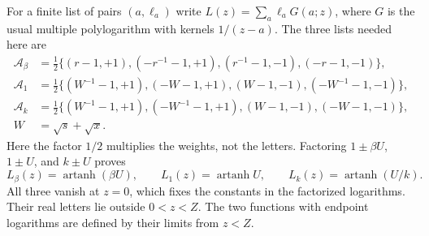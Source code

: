 For a finite list of pairs $(a,\ell_a)$ write
$L(z)=\sum_a\ell_aG(a;z)$, where $G$ is the usual multiple
polylogarithm with kernels $1/(z-a)$. The three lists needed here are
\begin{align}
 \mathcal A_\beta&=\tfrac12\{(r-1,+1),(-r^{-1}-1,+1),
 (r^{-1}-1,-1),(-r-1,-1)\},\\
 \mathcal A_1&=\tfrac12\{(W^{-1}-1,+1),(-W-1,+1),
 (W-1,-1),(-W^{-1}-1,-1)\},\\
 \mathcal A_k&=\tfrac12\{(W^{-1}-1,+1),(-W^{-1}-1,+1),
 (W-1,-1),(-W-1,-1)\},\\
 W&=\sqrt{s}+\sqrt{x}.
\end{align}
Here the factor $1/2$ multiplies the weights, not the letters.
Factoring $1\pm\beta U$, $1\pm U$, and $k\pm U$ proves
\begin{equation}
 L_\beta(z)=\operatorname{artanh}(\beta U),\qquad
 L_1(z)=\operatorname{artanh}U,\qquad
 L_k(z)=\operatorname{artanh}(U/k).
\end{equation}
All three vanish at $z=0$, which fixes the constants in the factorized
logarithms. Their real letters lie outside $0<z<Z$.
The two functions with endpoint logarithms are defined by their limits
from $z<Z$.

